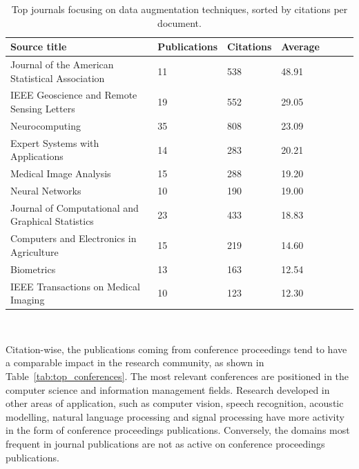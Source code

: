 \begin{table}[ht]
    \begin{center}
    \begin{tabular*}{\textwidth}{@{\extracolsep{\fill}}lllllll@{\extracolsep{\fill}}}
        \toprule
        Source title & Publications & Citations & Average \\
        \midrule
        Journal of the American Statistical Association & 11 & 538 & 48.91 \\
        IEEE Geoscience and Remote Sensing Letters & 19 & 552 & 29.05 \\
        Neurocomputing & 35 & 808 & 23.09 \\
        Expert Systems with Applications & 14 & 283 & 20.21 \\
        Medical Image Analysis & 15 & 288 & 19.20 \\
        Neural Networks & 10 & 190 & 19.00 \\
        Journal of Computational and Graphical Statistics & 23 & 433 & 18.83 \\
        Computers and Electronics in Agriculture & 15 & 219 & 14.60 \\
        Biometrics & 13 & 163 & 12.54 \\
        IEEE Transactions on Medical Imaging & 10 & 123 & 12.30 \\
        \bottomrule
    \end{tabular*}
    \caption[Top journals focusing on data augmentation techniques]{%
        Top journals focusing on data augmentation techniques, sorted by
        citations per document.
    }~\label{tab:top_journals}
    \end{center}
\end{table}

Citation-wise, the publications coming from conference proceedings tend to
have a comparable impact in the research community, as shown in
Table~\ref{tab:top_conferences}. The most relevant conferences are positioned
in the computer science and information management fields. Research developed
in other areas of application, such as computer vision, speech recognition,
acoustic modelling, natural language processing and signal processing have
more activity in the form of conference proceedings publications. Conversely,
the domains most frequent in journal publications are not as active on
conference proceedings publications.

